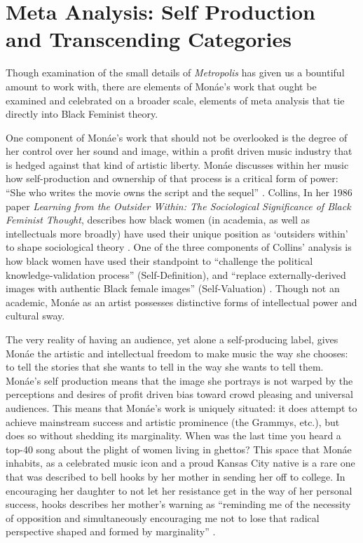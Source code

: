 \documentclass[a4paper, 11pt]{article} %
\begin{document}


\section*{Meta Analysis: Self Production and Transcending Categories}

Though examination of the small details of \emph{Metropolis} has given us a bountiful amount to work with, there are elements of Mon\'ae's work that ought be examined and celebrated on a broader scale, elements of meta analysis that tie directly into Black Feminist theory.

One component of Mon\'ae's work that should not be overlooked is the degree of her control over her sound and image, within a profit driven music industry that is hedged against that kind of artistic liberty.
Mon\'ae discusses within her music how self-production and ownership of that process is a critical form of power: 
``She who writes the movie owns the script and the sequel'' \cite{queen}.
Collins, In her 1986 paper \emph{Learning from the Outsider Within: The Sociological Significance of Black Feminist Thought}, describes how black women (in academia, as well as intellectuals more broadly) have used their unique position as `outsiders within' to shape sociological theory \cite{collins86}.
One of the three components of Collins' analysis is how black women have used their standpoint to ``challenge the political knowledge-validation process'' (Self-Definition), and ``replace externally-derived images with authentic Black female images'' (Self-Valuation) \cite{collins86}.
Though not an academic, Mon\'ae as an artist possesses distinctive forms of intellectual power and cultural sway.

The very reality of having an audience, yet alone a self-producing label, gives Mon\'ae the artistic and intellectual freedom to make music the way she chooses: to tell the stories that she wants to tell in the way she wants to tell them.
Mon\'ae's self production means that the image she portrays is not warped by the perceptions and desires of profit driven bias toward crowd pleasing and universal audiences.
This means that Mon\'ae's work is uniquely situated: it does attempt to achieve mainstream success and artistic prominence (the Grammys, etc.), but does so without shedding its marginality.
When was the last time you heard a top-40 song about the plight of women living in ghettos?
This space that Mon\'ae inhabits, as a celebrated music icon and a proud Kansas City native is a rare one that was described to bell hooks by her mother in sending her off to college.
In encouraging her daughter to not let her resistance get in the way of her personal success, hooks describes her mother's warning as ``reminding me of the necessity of opposition and simultaneously encouraging me not to lose that radical perspective shaped and formed by marginality'' \cite{hookschoosing}.
\end{document}
